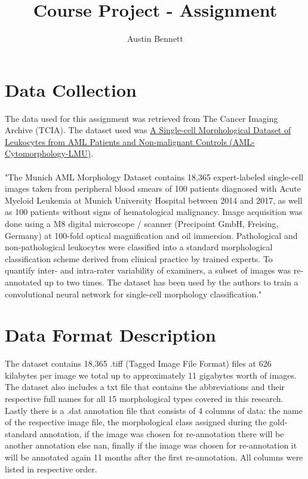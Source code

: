 \documentclass[12pt]{article}
\newcommand\tab[1][1cm]{\hspace*{#1}}
\begin{document}
\title{Course Project - Assignment}
\author{Austin Bennett}
\maketitle

\section{Data Collection}

\tab The data used for this assignment was retrieved from The Cancer Imaging Archive (TCIA). The dataset used was 
\href{https://wiki.cancerimagingarchive.net/pages/viewpage.action?pageId=61080958}{A Single-cell Morphological Dataset of Leukocytes from AML Patients and Non-malignant Controls (AML-Cytomorphology-LMU)}. \\ \\
\tab "The Munich AML Morphology Dataset contains 18,365 expert-labeled single-cell images taken from peripheral blood smears of 100 patients diagnosed with Acute Myeloid Leukemia at Munich University Hospital between 2014 and 2017, as well as 100 patients without signs of hematological malignancy. Image acquisition was done using a M8 digital microscope / scanner (Precipoint GmbH, Freising, Germany) at 100-fold optical magnification and oil immersion. Pathological and non-pathological leukocytes were classified into a standard morphological classification scheme derived from clinical practice by trained experts. To quantify inter- and intra-rater variability of examiners, a subset of images was re-annotated up to two times. The dataset has been used by the authors to train a convolutional neural network for single-cell morphology classification." ~\cite{Matek}







\section{Data Format Description}
\tab The dataset contains 18,365 .tiff (Tagged Image File Format) files at 626 kilabytes per image we total up to approximately 11 gigabytes worth of images. The dataset also includes a txt file that contains the abbreviations and their respective full names for all 15 morphological types covered in this research. Lastly there is a .dat annotation file that consists of 4 columns of data: the name of the respective image file, the morphological class assigned during the gold-standard annotation, if the image was chosen for re-annotation there will be another annotation else nan, finally if the image was chosen for re-annotation it will be annotated again 11 months after the first re-annotation. All columns were listed in respective order.
\end{document}
